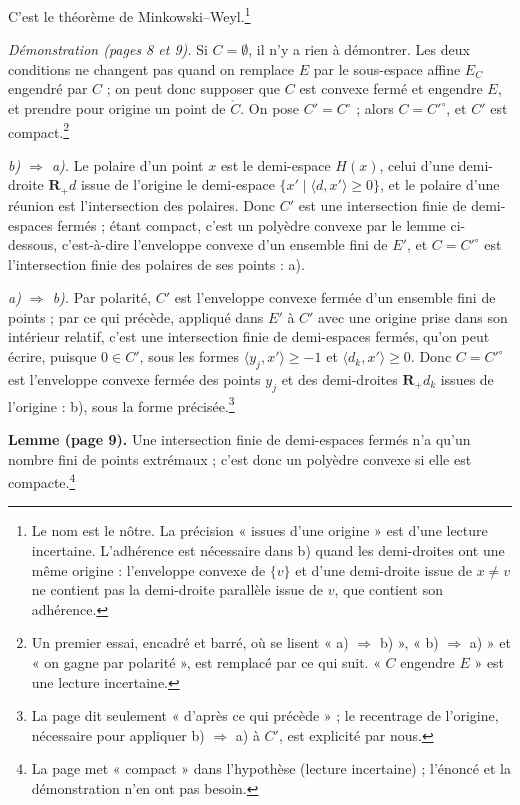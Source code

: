 \documentclass[11pt,a4paper]{article}
\begin{document}
C'est le théorème de Minkowski--Weyl.\footnote{Le nom est le nôtre. La
précision « issues d'une origine » est d'une lecture incertaine. L'adhérence
est nécessaire dans b) quand les demi-droites ont une même origine :
l'enveloppe convexe de $\{v\}$ et d'une demi-droite issue de $x \neq v$ ne
contient pas la demi-droite parallèle issue de $v$, que contient son
adhérence.}

\emph{Démonstration (pages 8 et 9).} Si $C = \emptyset$, il n'y a rien à
démontrer. Les deux conditions ne changent pas quand on remplace $E$ par le
sous-espace affine $E_{C}$ engendré par $C$ ; on peut donc supposer que $C$ est
convexe fermé et engendre $E$, et prendre pour origine un point de
$\mathring{C}$. On pose $C' = C^{\circ}$ ; alors $C = C'^{\circ}$, et $C'$ est
compact.\footnote{Un premier essai, encadré et barré, où se lisent « a)
$\Rightarrow$ b) », « b) $\Rightarrow$ a) » et « on gagne par polarité », est
remplacé par ce qui suit. « $C$ engendre $E$ » est une lecture incertaine.}

\emph{b) $\Rightarrow$ a).} Le polaire d'un point $x$ est le demi-espace $H(x)$,
celui d'une demi-droite $\mathbf{R}_{+} d$ issue de l'origine le demi-espace
$\{x' \mid \langle d, x'\rangle \geq 0\}$, et le polaire d'une réunion est
l'intersection des polaires. Donc $C'$ est une intersection finie de
demi-espaces fermés ; étant compact, c'est un polyèdre convexe par le lemme
ci-dessous, c'est-à-dire l'enveloppe convexe d'un ensemble fini de $E'$, et
$C = C'^{\circ}$ est l'intersection finie des polaires de ses points : a).

\emph{a) $\Rightarrow$ b).} Par polarité, $C'$ est l'enveloppe convexe fermée d'un
ensemble fini de points ; par ce qui précède, appliqué dans $E'$ à $C'$ avec une
origine prise dans son intérieur relatif, c'est une intersection finie de
demi-espaces fermés, qu'on peut écrire, puisque $0 \in C'$, sous les formes
$\langle y_{j}, x'\rangle \geq -1$ et $\langle d_{k}, x'\rangle \geq 0$. Donc
$C = C'^{\circ}$ est l'enveloppe convexe fermée des points $y_{j}$ et des
demi-droites $\mathbf{R}_{+} d_{k}$ issues de l'origine : b), sous la forme
précisée.\footnote{La page dit seulement « d'après ce qui précède » ; le
recentrage de l'origine, nécessaire pour appliquer b) $\Rightarrow$ a) à $C'$,
est explicité par nous.}

\textbf{Lemme (page 9).} Une intersection finie de demi-espaces fermés n'a
qu'un nombre fini de points extrémaux ; c'est donc un polyèdre convexe si elle
est compacte.\footnote{La page met « compact » dans l'hypothèse (lecture
incertaine) ; l'énoncé et la démonstration n'en ont pas besoin.}
\end{document}
